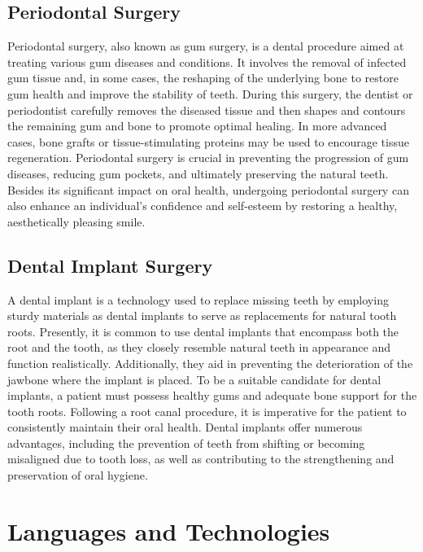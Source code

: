 \documentclass[12pt,oneside,openright,a4paper]{cpe-english-project}
\begin{document}
    \subsection{Periodontal Surgery}
      \qquad Periodontal surgery, also known as gum surgery, is a dental procedure aimed at treating various gum diseases and conditions. It involves the removal of infected gum tissue and, in some cases, the reshaping of the underlying bone to restore gum health and improve the stability of teeth. During this surgery, the dentist or periodontist carefully removes the diseased tissue and then shapes and contours the remaining gum and bone to promote optimal healing. In more advanced cases, bone grafts or tissue-stimulating proteins may be used to encourage tissue regeneration. Periodontal surgery is crucial in preventing the progression of gum diseases, reducing gum pockets, and ultimately preserving the natural teeth. Besides its significant impact on oral health, undergoing periodontal surgery can also enhance an individual's confidence and self-esteem by restoring a healthy, aesthetically pleasing smile.\cite{periodontal1,periodontal2}\par
  
    \subsection{Dental Implant Surgery}
      \qquad A dental implant is a technology used to replace missing teeth by employing sturdy materials as dental implants to serve as replacements for natural tooth roots. Presently, it is common to use dental implants that encompass both the root and the tooth, as they closely resemble natural teeth in appearance and function realistically. Additionally, they aid in preventing the deterioration of the jawbone where the implant is placed. To be a suitable candidate for dental implants, a patient must possess healthy gums and adequate bone support for the tooth roots. Following a root canal procedure, it is imperative for the patient to consistently maintain their oral health. Dental implants offer numerous advantages, including the prevention of teeth from shifting or becoming misaligned due to tooth loss, as well as contributing to the strengthening and preservation of oral hygiene.\cite{dentalImplant1,dentalImplant2}\par
  
  \section{Languages and Technologies}
\end{document}
